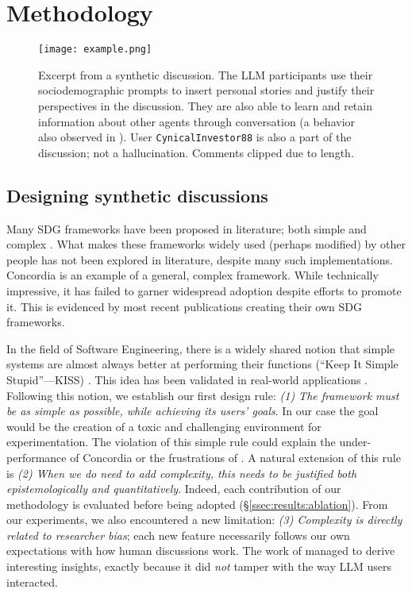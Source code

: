 %

\section{Methodology}
\label{sec:methodology}

 \begin{figure*}[t]
	\centering
	\texttt{[image: example.png]}
	\caption{Excerpt from a synthetic discussion. The LLM participants use their sociodemographic prompts to insert personal stories and justify their perspectives in the discussion. They are also able to learn and retain information about other agents through conversation (a behavior also observed in \citet{park2023game}). User \texttt{CynicalInvestor88} is also a part of the discussion; not a hallucination. Comments clipped due to length.}
	\label{fig::example}
\end{figure*}


\subsection{Designing synthetic discussions}
\label{ssec:methodology:design}

Many SDG frameworks have been proposed in literature; both simple \citep{Tsai_Deliberate_Lab_Open-Source_2025, ulmer2024} and complex \citep{balog_2024, abdelnabi_negotiations, park2023game}. What makes these frameworks widely used (perhaps modified) by other people has not been explored in literature, despite many such implementations. Concordia \citep{Vezhnevets2023GenerativeAM} is an example of a general, complex framework. While technically impressive, it has failed to garner widespread adoption despite efforts to promote it. This is evidenced by most recent publications creating their own SDG frameworks.

In the field of Software Engineering, there is a widely shared notion that simple systems are almost always better at performing their functions (``Keep It Simple Stupid''---KISS) \citep{beck2000extreme, thomas2025simplicity}. This idea has been validated in real-world applications \citep{banker1989software, ogheneovo2014relationship}. Following this notion, we establish our first design rule: \emph{(1) The framework must be as simple as possible, while achieving its users' goals}. In our case the goal would be the creation of a toxic and challenging environment for experimentation. The violation of this simple rule could explain the under-performance of Concordia or the frustrations of \citet{balog_2024}. A natural extension of this rule is \emph{(2) When we do need to add complexity, this needs to be justified both epistemologically and quantitatively}. Indeed, each contribution of our methodology is evaluated before being adopted (\S\ref{ssec:results:ablation}). From our experiments, we also encountered a new limitation: \emph{(3) Complexity is directly related to researcher bias}; each new feature necessarily follows our own expectations with how human discussions work. The work of \citet{park2023game} managed to derive interesting insights, exactly because it did \emph{not} tamper with the way LLM users interacted.

